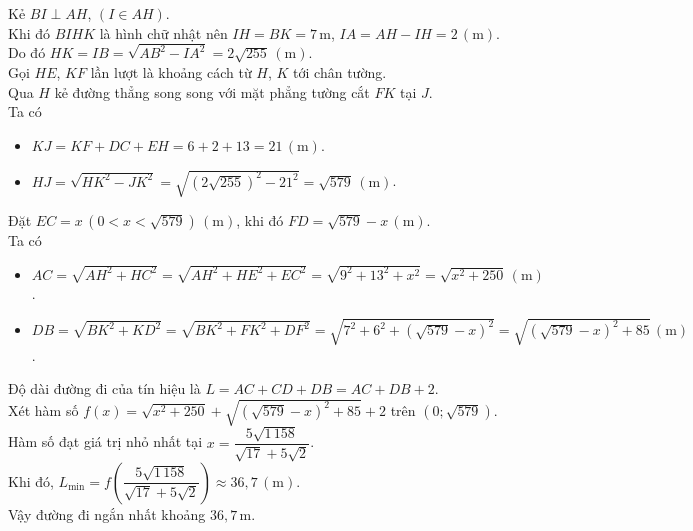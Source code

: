 \begin{ex}
{\begin{center}
		\end{center}
		Kẻ $BI\perp AH$, $(I\in AH)$.\\
		Khi đó $BIHK$ là hình chữ nhật nên $IH=BK = 7\mathrm{\,m}$, $IA=AH-IH= 2\mathrm{\,(m)}$.\\
		Do đó $HK=IB= \sqrt{AB^2 - IA^2}=2\sqrt{255}\mathrm{\,(m)}$.\\
		Gọi $HE$, $KF$ lần lượt là khoảng cách từ $H$, $K$ tới chân tường.\\
		Qua $H$ kẻ đường thẳng song song với mặt phẳng tường cắt $FK$ tại $J$.\\
		Ta có
		\begin{itemize}
			\item $KJ=KF+DC+EH=6+2+13=21\mathrm{\,(m)}$.
			\item $HJ=\sqrt{HK^2-JK^2}=\sqrt{\left(2\sqrt{255}\right)^2-21^2}=\sqrt{579}\mathrm{\,(m)}$.
		\end{itemize}
		Đặt $EC = x\,\left(0 < x < \sqrt{579}\right)\mathrm{\,(m)}$, khi đó $FD = \sqrt{579} - x\mathrm{\,(m)}$.\\
		Ta có
		\begin{itemize}
			\item $AC = \sqrt{AH^2 + HC^2}=\sqrt{AH^2 + HE^2+EC^2}= \sqrt{9^2 + 13^2 + x^2} = \sqrt{x^2 + 250}\mathrm{\,(m)}$.
			\item $DB = \sqrt{BK^2 + KD^2} =\sqrt{BK^2 +FK^2+ DF^2}= \sqrt{7^2 + 6^2 + \left(\sqrt{579}-x\right)^2} = \sqrt{\left(\sqrt{579}-x\right)^2 + 85}\mathrm{\,(m)}$.
		\end{itemize}
		Độ dài đường đi của tín hiệu là $L = AC + CD + DB = AC + DB + 2$.\\
		Xét hàm số $f(x) = \sqrt{x^2 + 250} + \sqrt{(\sqrt{579}-x)^2 + 85} + 2$ trên $\left(0; \sqrt{579}\right)$.\\
		Hàm số đạt giá trị nhỏ nhất tại $x=\dfrac{5\sqrt{1\,158}}{\sqrt{17} + 5\sqrt{2}}$.\\
		Khi đó, $L_{\min} = f\left(\dfrac{5\sqrt{1\,158}}{\sqrt{17} + 5\sqrt{2}}\right) \approx 36{,}7\mathrm{\,(m)}$.\\
		Vậy đường đi ngắn nhất khoảng $36{,}7\mathrm{\,m}$.
	}
\end{ex}

